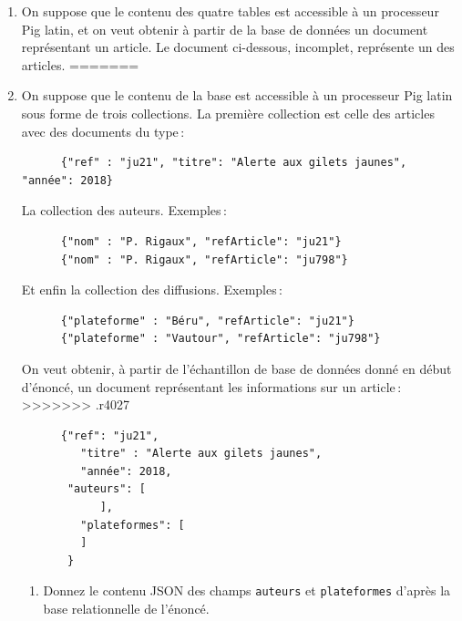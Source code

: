 \documentclass[11pt,a4paper]{article}
\begin{document}
\begin{enumerate}
<<<<<<< .mine
  \item On suppose que le contenu des quatre tables est accessible à un processeur
    Pig latin, et on veut obtenir à partir de la base de données un document
    représentant un article. Le document ci-dessous, incomplet, représente un des articles.
=======
  \item On suppose que le contenu de la base  est accessible à un processeur
    Pig latin sous forme de trois collections. La première collection est celle
    des articles avec des documents du type\,:
    \begin{small}
    \begin{verbatim}
      {"ref" : "ju21", "titre": "Alerte aux gilets jaunes", "année": 2018}
    \end{verbatim}
    \end{small}
    La collection des auteurs. Exemples\,:
    \begin{small}
        \begin{verbatim}
      {"nom" : "P. Rigaux", "refArticle": "ju21"}
      {"nom" : "P. Rigaux", "refArticle": "ju798"}
    \end{verbatim}
    \end{small}
    Et enfin la collection des diffusions. Exemples\,:
    \begin{small}
     \begin{verbatim}
      {"plateforme" : "Béru", "refArticle": "ju21"}
      {"plateforme" : "Vautour", "refArticle": "ju798"}
    \end{verbatim}
    \end{small}
     
    On veut obtenir, à partir 
    de l'échantillon de base de données donné en début d'énoncé, un document
    représentant les informations sur un article\,:
>>>>>>> .r4027
    
    \begin{small}
    \begin{verbatim}
      {"ref": "ju21",
         "titre" : "Alerte aux gilets jaunes",
         "année": 2018,
       "auteurs": [
            ],
         "plateformes": [
         ]
       }
    \end{verbatim}
    \end{small}
    
    
    \begin{enumerate}
      \item Donnez le contenu JSON des champs \texttt{auteurs} et \texttt{plateformes}
          d'après la base relationnelle de l'énoncé.
          

\end{enumerate}
\end{enumerate}
\end{document}
